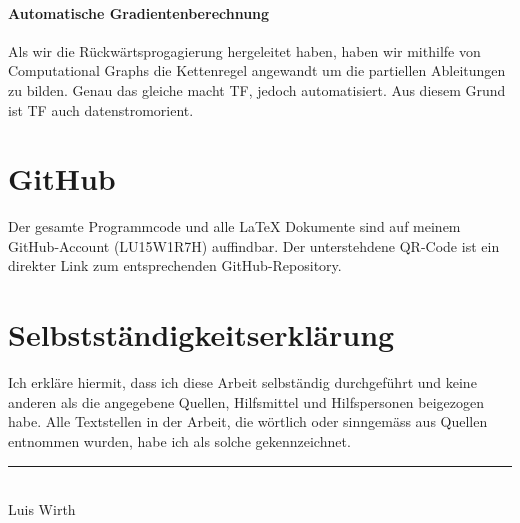 \begin{appendices}
\subsubsection*{Automatische Gradientenberechnung}
Als wir die Rückwärtsprogagierung hergeleitet haben, haben wir mithilfe von
Computational Graphs die Kettenregel angewandt um die partiellen Ableitungen zu
bilden. Genau das gleiche macht TF, jedoch automatisiert. Aus diesem Grund ist
TF auch datenstromorient.



\chapter{GitHub}
Der gesamte Programmcode und alle \LaTeX{} Dokumente sind auf meinem
GitHub-Account (LU15W1R7H) auffindbar. Der unterstehdene QR-Code ist ein
direkter Link zum entsprechenden GitHub-Repository.
\para{}


\end{appendices}

\printbibliography[heading=bibintoc]

\listoffigures

\listoftables

\chapter*{Selbstständigkeitserklärung}
Ich erkläre hiermit, dass ich diese Arbeit selbständig durchgeführt und keine anderen als die angegebene Quellen, Hilfsmittel und Hilfspersonen beigezogen habe. Alle Textstellen in der Arbeit, die wörtlich oder sinngemäss aus Quellen entnommen wurden, habe ich als solche gekennzeichnet.

\vspace{2cm}
\begin{center}
  \noindent\rule{5cm}{0.4pt}\\
  Luis Wirth
\end{center}


